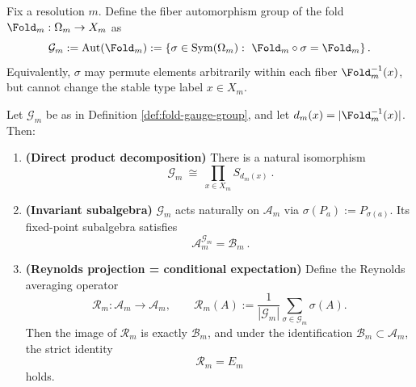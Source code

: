 \begin{definition}\label{def:fold-gauge-group}
Fix a resolution \(m\). Define the fiber automorphism group of the fold \(\Fold_m:\Omega_m\to X_m\) as
\[
\mathcal{G}_m
:=
\mathrm{Aut}(\Fold_m)
:=
\left\{\sigma\in \mathrm{Sym}(\Omega_m):\ \Fold_m\circ \sigma=\Fold_m\right\}.
\]
Equivalently, \(\sigma\) may permute elements arbitrarily within each fiber \(\Fold_m^{-1}(x)\), but cannot change the stable type label \(x\in X_m\).
\end{definition}

\begin{proposition}\label{prop:fold-gauge-reynolds}
Let \(\mathcal{G}_m\) be as in Definition \ref{def:fold-gauge-group}, and let \(d_m(x)=|\Fold_m^{-1}(x)|\).
Then:
\begin{enumerate}
  \item \textbf{(Direct product decomposition)} There is a natural isomorphism
  \[
  \boxed{\ \mathcal{G}_m\ \cong\ \prod_{x\in X_m} S_{d_m(x)}\ }.
  \]
  \item \textbf{(Invariant subalgebra)} \(\mathcal{G}_m\) acts naturally on \(\mathcal{A}_m\) via \(\sigma(P_a):=P_{\sigma(a)}\). Its fixed-point subalgebra satisfies
  \[
  \boxed{\ \mathcal{A}_m^{\mathcal{G}_m}=\mathcal{B}_m\ }.
  \]
  \item \textbf{(Reynolds projection = conditional expectation)} Define the Reynolds averaging operator
  \[
  \mathcal{R}_m:\mathcal{A}_m\to\mathcal{A}_m,\qquad
  \mathcal{R}_m(A):=\frac{1}{|\mathcal{G}_m|}\sum_{\sigma\in\mathcal{G}_m}\sigma(A).
  \]
  Then the image of \(\mathcal{R}_m\) is exactly \(\mathcal{B}_m\), and under the identification \(\mathcal{B}_m\subset\mathcal{A}_m\), the strict identity
  \[
  \boxed{\ \mathcal{R}_m=E_m\ }
  \]
  holds.
\end{enumerate}
\end{proposition}
